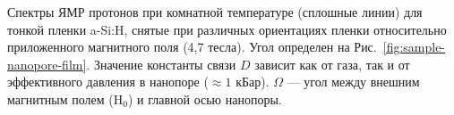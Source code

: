 Спектры ЯМР протонов при комнатной температуре (сплошные линии)
для тонкой пленки a-Si:H,
снятые при различных ориентациях пленки относительно приложенного магнитного поля (4,7 тесла).
Угол определен на  Рис.~\ref{fig:sample-nanopore-film}.
Значение константы связи $D$ зависит как от газа,
так и от эффективного давления в нанопоре ($\approx 1$ кБар).
$\Omega$ --- угол между внешним магнитным полем (H$_0$) и главной осью нанопоры.
